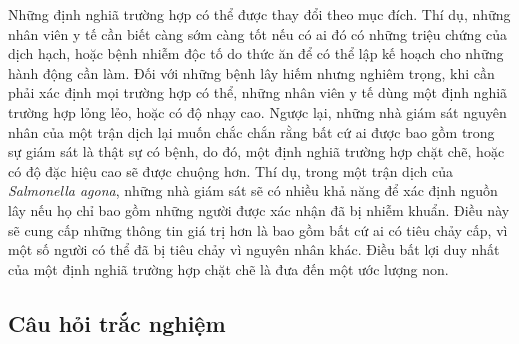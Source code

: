\documentclass[
]{book}
\begin{document}
Những định nghiã trường hợp có thể được thay đổi theo mục đích. Thí dụ, những nhân viên y tế cần biết càng sớm càng tốt nếu có ai đó có những triệu chứng của dịch hạch, hoặc bệnh nhiễm độc tố do thức ăn để có thể lập kế hoạch cho những hành động cần làm. Đối với những bệnh lây hiếm nhưng nghiêm trọng, khi cần phải xác định mọi trường hợp có thể, những nhân viên y tế dùng một định nghiã trường hợp lỏng lẻo, hoặc có độ nhạy cao. Ngược lại, những nhà giám sát nguyên nhân của một trận dịch lại muốn chắc chắn rằng bất cứ ai được bao gồm trong sự giám sát là thật sự có bệnh, do đó, một định nghiã trường hợp chặt chẽ, hoặc có độ đặc hiệu cao sẽ được chuộng hơn. Thí dụ, trong một trận dịch của \emph{Salmonella agona}, những nhà giám sát sẽ có nhiều khả năng để xác định nguồn lây nếu họ chỉ bao gồm những người được xác nhận đã bị nhiễm khuẩn. Điều này sẽ cung cấp những thông tin giá trị hơn là bao gồm bất cứ ai có tiêu chảy cấp, vì một số người có thể đã bị tiêu chảy vì nguyên nhân khác. Điều bất lợi duy nhất của một định nghiã trường hợp chặt chẽ là đưa đến một ước lượng non.

\hypertarget{cuxe2u-hux1ecfi-trux1eafc-nghiux1ec7m-3}{%
\subsection{Câu hỏi trắc nghiệm}\label{cuxe2u-hux1ecfi-trux1eafc-nghiux1ec7m-3}}
\end{document}
